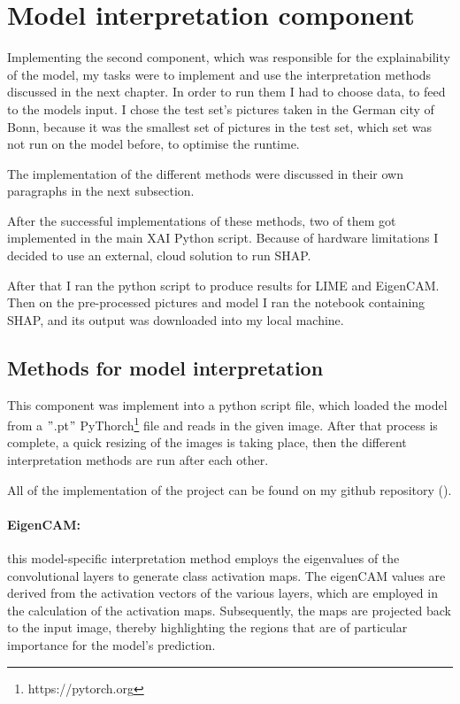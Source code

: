 


\section{Model interpretation component}\label{sec:model-interpretation2}
Implementing the second component, which was responsible for the explainability of the model, my tasks were to implement and use the interpretation methods discussed in the next chapter.
In order to run them I had to choose data, to feed to the models input.
I chose the test set's pictures taken in the German city of Bonn,
because it was the smallest set of pictures in the test set, which set was not run on the model before, to optimise the runtime.

The implementation of the different methods were discussed in their own paragraphs in the next subsection.

After the successful implementations of these methods, two of them got implemented in the main XAI Python script. Because of hardware limitations I decided to use an external, cloud solution to run SHAP.

After that I ran the python script to produce results for LIME and EigenCAM. Then on the pre-processed pictures and model I ran the notebook containing SHAP, and its output was downloaded into my local machine.

\subsection{Methods for model interpretation}\label{subsec:methods-for-model-interpretation}

This component was implement into a python script file, which loaded the model from a \("\).pt\("\) PyThorch\footnote{https://pytorch.org} file and reads in the given image.
After that process is complete, a quick resizing of the images is taking place, then the different interpretation methods are run after each other.

All of the implementation of the project can be found on my github repository ().

\paragraph{EigenCAM:}\label{par:eigencam}
this model-specific interpretation method employs the eigenvalues of the convolutional layers to generate class activation maps.
The eigenCAM values are derived from the activation vectors of the various layers, which are employed in the calculation of the activation maps.
Subsequently, the maps are projected back to the input image, thereby highlighting the regions that are of particular importance for the model's prediction.

